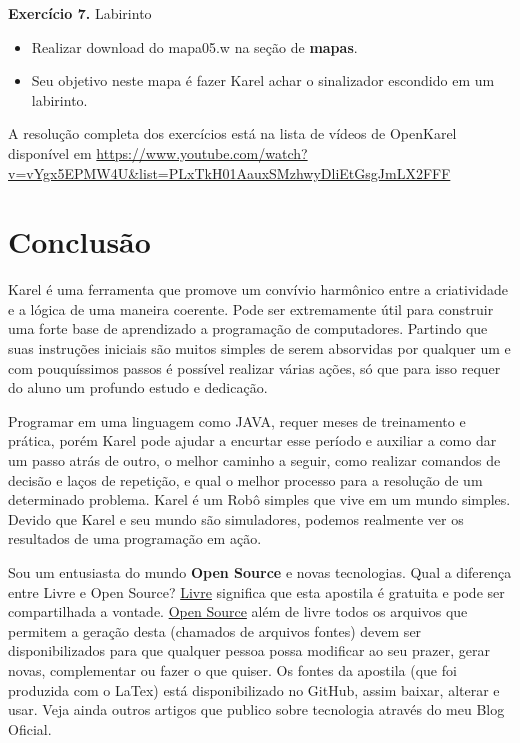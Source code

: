 \documentclass[a4paper,11pt]{article}
\begin{document}
\textbf{Exercício 7.} Labirinto \vspace{-1em}
\begin{itemize}[nolistsep]
	\item Realizar download do mapa05.w na seção de \textbf{mapas}.
	\item Seu objetivo neste mapa é fazer Karel achar o sinalizador escondido em um labirinto.
\end{itemize}

A resolução completa dos exercícios está na lista de vídeos de OpenKarel disponível em \url{https://www.youtube.com/watch?v=vYgx5EPMW4U&list=PLxTkH01AauxSMzhwyDliEtGsgJmLX2FFF}

\section{Conclusão}
Karel é uma ferramenta que promove um convívio harmônico entre a criatividade e a lógica de uma maneira coerente. Pode ser extremamente útil para construir uma forte base de aprendizado a programação de computadores. Partindo que suas instruções iniciais são muitos simples de serem absorvidas por qualquer um e com pouquíssimos passos é possível realizar várias ações, só que para isso requer do aluno um profundo estudo e dedicação.

Programar em uma linguagem como JAVA, requer meses de treinamento e prática, porém Karel pode ajudar a encurtar esse período e auxiliar a como dar um passo atrás de outro, o melhor caminho a seguir, como realizar comandos de decisão e laços de repetição, e qual o melhor processo para a resolução de um determinado problema. Karel é um Robô simples que vive em um mundo simples. Devido que Karel e seu mundo são simuladores, podemos realmente ver os resultados de uma programação em ação. 

Sou um entusiasta do mundo \textbf{Open Source} e novas tecnologias. Qual a diferença entre Livre e Open Source? \underline{Livre} significa que esta apostila é gratuita e pode ser compartilhada a vontade. \underline{Open Source} além de livre todos os arquivos que permitem a geração desta (chamados de arquivos fontes) devem ser disponibilizados para que qualquer pessoa possa modificar ao seu prazer, gerar novas, complementar ou fazer o que quiser. Os fontes da apostila (que foi produzida com o LaTex) está disponibilizado no GitHub\cite{github}, assim baixar, alterar e usar. Veja ainda outros artigos que publico sobre tecnologia através do meu Blog Oficial\cite{fernandoanselmo}.
\end{document}
